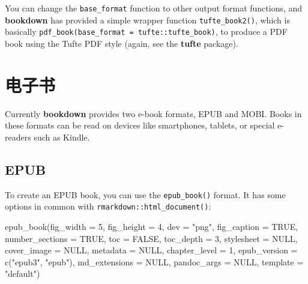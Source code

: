 \documentclass[
  12pt,
]{krantz}
\newenvironment{Shaded}{\begin{snugshade}}{\end{snugshade}}
\newcommand{\AttributeTok}[1]{\textcolor[rgb]{0.77,0.63,0.00}{#1}}
\newcommand{\ConstantTok}[1]{\textcolor[rgb]{0.00,0.00,0.00}{#1}}
\newcommand{\DecValTok}[1]{\textcolor[rgb]{0.00,0.00,0.81}{#1}}
\newcommand{\FunctionTok}[1]{\textcolor[rgb]{0.00,0.00,0.00}{#1}}
\newcommand{\NormalTok}[1]{#1}
\newcommand{\StringTok}[1]{\textcolor[rgb]{0.31,0.60,0.02}{#1}}
\theoremstyle{definition}
\theoremstyle{definition}
\theoremstyle{definition}
\theoremstyle{definition}
\theoremstyle{remark}
\begin{document}
You can change the \texttt{base\_format} function to other output format functions, and \textbf{bookdown} has provided a simple wrapper function \texttt{tufte\_book2()}, which is basically \texttt{pdf\_book(base\_format\ =\ tufte::tufte\_book)}, to produce a PDF book using the Tufte PDF style (again, see the \textbf{tufte} package).

\hypertarget{ux7535ux5b50ux4e66}{%
\section{电子书}\label{ux7535ux5b50ux4e66}}

Currently \textbf{bookdown} provides two e-book formats, EPUB and MOBI. Books in these formats can be read on devices like smartphones, tablets, or special e-readers such as Kindle.

\hypertarget{epub}{%
\subsection{EPUB}\label{epub}}

To create an EPUB book, you can use the \texttt{epub\_book()} format. It has some options in common with \texttt{rmarkdown::html\_document()}:

\begin{Shaded}
\begin{Highlighting}[]
\FunctionTok{epub\_book}\NormalTok{(}\AttributeTok{fig\_width =} \DecValTok{5}\NormalTok{, }\AttributeTok{fig\_height =} \DecValTok{4}\NormalTok{, }\AttributeTok{dev =} \StringTok{"png"}\NormalTok{,}
  \AttributeTok{fig\_caption =} \ConstantTok{TRUE}\NormalTok{, }\AttributeTok{number\_sections =} \ConstantTok{TRUE}\NormalTok{,}
  \AttributeTok{toc =} \ConstantTok{FALSE}\NormalTok{, }\AttributeTok{toc\_depth =} \DecValTok{3}\NormalTok{, }\AttributeTok{stylesheet =} \ConstantTok{NULL}\NormalTok{,}
  \AttributeTok{cover\_image =} \ConstantTok{NULL}\NormalTok{, }\AttributeTok{metadata =} \ConstantTok{NULL}\NormalTok{,}
  \AttributeTok{chapter\_level =} \DecValTok{1}\NormalTok{, }\AttributeTok{epub\_version =} \FunctionTok{c}\NormalTok{(}\StringTok{"epub3"}\NormalTok{, }\StringTok{"epub"}\NormalTok{),}
  \AttributeTok{md\_extensions =} \ConstantTok{NULL}\NormalTok{, }\AttributeTok{pandoc\_args =} \ConstantTok{NULL}\NormalTok{,}
  \AttributeTok{template =} \StringTok{"default"}\NormalTok{)}
\end{Highlighting}
\end{Shaded}
\end{document}
